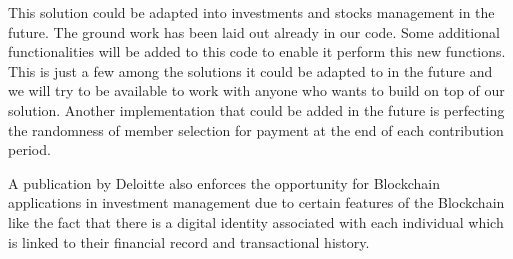 \documentclass{article}
\begin{document}
\begin{flushleft}
This solution could be adapted into investments and stocks management in the future. The ground work has been laid out already in our code. Some additional functionalities will be added to this code to enable it perform this new functions. This is just a few among the solutions it could be adapted to in the future and we will try to be available to work with anyone who wants to build on top of our solution. Another implementation that could be added in the future is perfecting the randomness of member selection for payment at the end of each contribution period.

\cite{deloitte} A publication by Deloitte also enforces the opportunity for Blockchain applications in investment management due to certain features of the Blockchain like the fact that there is a digital identity associated with each individual which is linked to their financial record and transactional history.

\end{flushleft}
%
%

\clearpage
\printbibliography
\end{document}
